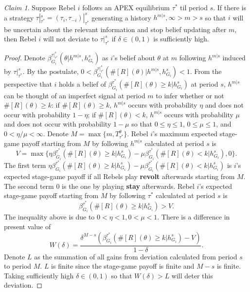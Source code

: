 \documentclass[12pt,letter]{article}
\theoremstyle{definition}
\theoremstyle{remark}
\theoremstyle{claim}
\newtheorem{claim}{Claim}
\begin{document}
\begin{claim}
\label{claim:uncertain}
Suppose Rebel $i$ follows an APEX equilibrium $\tau^{*}$ til period $s$. If there is a strategy $\tau|^s_{\tau^{*}}=(\tau_i,\tau_{-i})|^s_{\tau^{*}}$  generating a history $h^{m|s}, \infty>m>s$ so that $i$ will be uncertain about the relevant information and stop belief updating after $m$, then Rebel $i$ will not deviate to $\tau|^s_{\tau^{*}}$ if $\delta\in(0,1)$ is sufficiently high.
\end{claim}

\begin{proof}
Denote $\beta^{\tau|^s_{\tau^{*}}}_{G_i}(\theta|h^{m|s}, h^s_{G_i})$ as $i$'s belief about $\theta$ at $m$ following $h^{m|s}$ induced by $\tau|^s_{\tau^{*}}$. By the postulate,  $0<\beta^{\tau|^s_{\tau^{*}}}_{G_i}(\#[R](\theta)|h^{m|s}, h^s_{G_i})<1$. From the perspective that $i$ holds a belief of $\beta^{\tau^{*}}_{G_i}(\#[R](\theta)\geq k|h^s_{G_i})$ at period $s$, $h^{m|s}$ can be thought of an imperfect signal at period $m$ to infer whether or not $\#[R](\theta)\geq k$: if $\#[R](\theta)\geq k$, $h^{m|s}$ occurs with probability $\eta$ and does not occur with probability $1-\eta$; if $\#[R](\theta)< k$, $h^{m|s}$ occurs with probability $\mu$ and does not occur with probability $1-\mu$ so that $0\leq \eta \leq 1$, $0\leq\mu\leq 1$, and $0<\eta/\mu<\infty$. Denote $M=\max\{m, T^{\theta}_{\tau^{*}}\}$. Rebel $i$'s maximum expected stage-game payoff starting from $M$ by following $h^{m|s}$ calculated at period $s$ is 
\[V=\max\{\eta\beta^{\tau^{*}}_{G_i}(\#[R](\theta)\geq k|h^s_{G_i})-\mu\beta^{\tau^{*}}_{G_i}(\#[R](\theta)< k|h^s_{G_i}),0\}.\]
The first term $\eta\beta^{\tau^{*}}_{G_i}(\#[R](\theta)\geq k|h^s_{G_i})-\mu\beta^{\tau^{*}}_{G_i}(\#[R](\theta)< k|h^s_{G_i})$ is $i$'s expected stage-game payoff if all Rebels play \textbf{revolt} afterwards starting from $M$.  The second term $0$ is the one by playing \textbf{stay} afterwards. Rebel $i$'s expected stage-game payoff starting from $M$ by following $\tau^{*}$ calculated at period $s$ is 
\[\beta^{\tau^{*}}_{G_i}(\#[R](\theta)\geq k|h^s_{G_i})>V.\]
The inequality above is due to $0<\eta<1,0<\mu<1$. There is a difference in present value of
\[W(\delta)=\frac{\delta^{M-s}(\beta^{\tau^{*}}_{G_i}(\#[R](\theta)\geq k|h^s_{G_i})-V)}{1-\delta}.\]
Denote $L$ as the summation of all gains from deviation calculated from period $s$ to period $M$. $L$ is finite since the stage-game payoff is finite and $M-s$ is finite. Taking sufficiently high $\delta\in(0,1)$ so that $W(\delta)>L$ will deter this deviation.
\end{proof}
\end{document}
